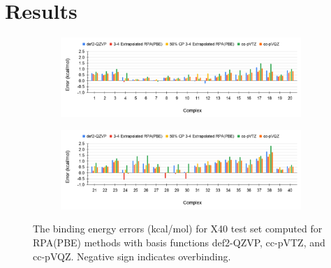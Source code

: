 \documentclass[11pt]{article}
\begin{document}
\section{Results}

\begin{figure}[hbpt]
  \centering
  \begin{subfigure}{\textwidth}
    \center
    \includegraphics[scale=0.35]{def2-QZVP_1.png}
    \label{fig:def2-QZVP_1}
  \end{subfigure}
  \begin{subfigure}{\textwidth}
    \center
    \includegraphics[scale=0.35]{def2-QZVP_2.png}
    \label{fig:def2-QZVP_2}
  \end{subfigure}
  \caption{The binding energy errors (kcal/mol) for X40 test set computed
    for RPA(PBE) methods with basis functions def2-QZVP, cc-pVTZ, and
    cc-pVQZ. Negative sign indicates overbinding.}
  \label{fig:def2-QZVP Error}
\end{figure}
\end{document}
